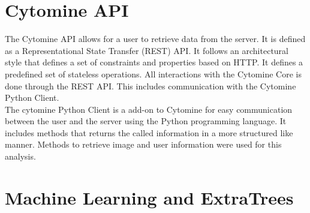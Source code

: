 \documentclass[a4paper,11pt]{report}
\numberwithin{figure}{chapter} %
\begin{document}
    \section{Cytomine API}

    The Cytomine API allows for a user to retrieve data from the server.
    It is defined as a Representational State Transfer (REST) API.
    It follows an architectural style that defines a set of constraints and properties based on HTTP.
    It defines a predefined set of stateless operations.
    All interactions with the Cytomine Core is done through the REST API.
    This includes communication with the Cytomine Python Client.\\

    The cytomine Python Client is a add-on to Cytomine for easy communication between the user and the server using the Python programming language.
    It includes methods that returns the called information in a more structured like manner.
    Methods to retrieve image and user information were used for this analysis.

    \section{Machine Learning and ExtraTrees}
\end{document}
